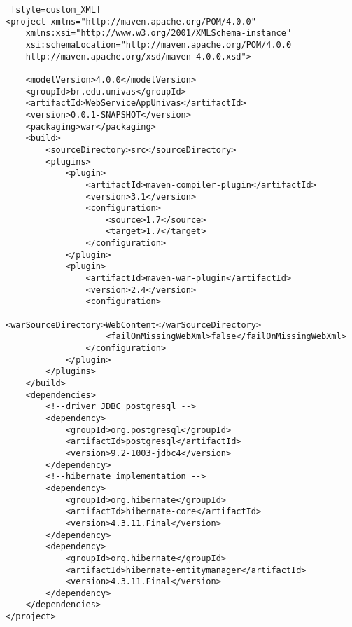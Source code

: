 \begin{lstlisting} [style=custom_XML]
<project xmlns="http://maven.apache.org/POM/4.0.0" 
	xmlns:xsi="http://www.w3.org/2001/XMLSchema-instance"
	xsi:schemaLocation="http://maven.apache.org/POM/4.0.0 
	http://maven.apache.org/xsd/maven-4.0.0.xsd">

	<modelVersion>4.0.0</modelVersion>
	<groupId>br.edu.univas</groupId>
	<artifactId>WebServiceAppUnivas</artifactId>
	<version>0.0.1-SNAPSHOT</version>
	<packaging>war</packaging>
	<build>
		<sourceDirectory>src</sourceDirectory>
		<plugins>
			<plugin>
				<artifactId>maven-compiler-plugin</artifactId>
				<version>3.1</version>
				<configuration>
					<source>1.7</source>
					<target>1.7</target>
				</configuration>
			</plugin>
			<plugin>
				<artifactId>maven-war-plugin</artifactId>
				<version>2.4</version>
				<configuration>
					<warSourceDirectory>WebContent</warSourceDirectory>
					<failOnMissingWebXml>false</failOnMissingWebXml>
				</configuration>
			</plugin>
		</plugins>
	</build>
	<dependencies>
		<!--driver JDBC postgresql -->
		<dependency>
			<groupId>org.postgresql</groupId>
			<artifactId>postgresql</artifactId>
			<version>9.2-1003-jdbc4</version>
		</dependency>
		<!--hibernate implementation -->
		<dependency>
			<groupId>org.hibernate</groupId>
			<artifactId>hibernate-core</artifactId>
			<version>4.3.11.Final</version>
		</dependency>
		<dependency>
			<groupId>org.hibernate</groupId>
			<artifactId>hibernate-entitymanager</artifactId>
			<version>4.3.11.Final</version>
		</dependency>
	</dependencies>
</project>
\end{lstlisting}